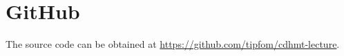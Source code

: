 \documentclass[aps,pra,showpacs,preprintnumbers,amsmath,amssymb,nofootinbib]{revtex4-2}
\begin{document}
    \section{GitHub}

    The source code can be obtained at \url{https://github.com/tipfom/cdhmt-lecture}.

     
\end{document}
